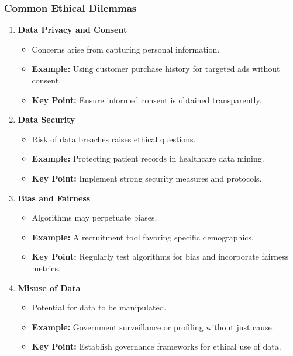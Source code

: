 \documentclass[aspectratio=169]{beamer}
\begin{document}
\begin{frame}[fragile]
    \frametitle{Common Ethical Dilemmas}
    \begin{enumerate}
        \item \textbf{Data Privacy and Consent}
            \begin{itemize}
                \item Concerns arise from capturing personal information.
                \item \textbf{Example:} Using customer purchase history for targeted ads without consent.
                \item \textbf{Key Point:} Ensure informed consent is obtained transparently.
            \end{itemize}
        
        \item \textbf{Data Security}
            \begin{itemize}
                \item Risk of data breaches raises ethical questions.
                \item \textbf{Example:} Protecting patient records in healthcare data mining.
                \item \textbf{Key Point:} Implement strong security measures and protocols.
            \end{itemize}
        
        \item \textbf{Bias and Fairness}
            \begin{itemize}
                \item Algorithms may perpetuate biases.
                \item \textbf{Example:} A recruitment tool favoring specific demographics.
                \item \textbf{Key Point:} Regularly test algorithms for bias and incorporate fairness metrics.
            \end{itemize}
        
        \item \textbf{Misuse of Data}
            \begin{itemize}
                \item Potential for data to be manipulated.
                \item \textbf{Example:} Government surveillance or profiling without just cause.
                \item \textbf{Key Point:} Establish governance frameworks for ethical use of data.
            \end{itemize}
    \end{enumerate}
\end{frame}
\end{document}

